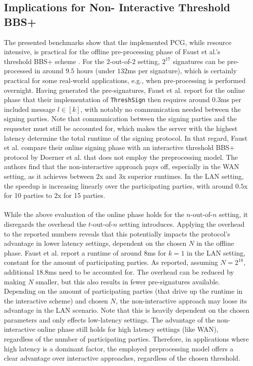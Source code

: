 \subsection{Implications for Non-
\label{subsec:implNIBBs+}
Interactive Threshold BBS+}
The presented benchmarks show that the implemented PCG, while resource intensive, is practical for the offline pre-processing phase of Faust et al.'s threshold BBS+ scheme \cite{cryptoeprint:2023/1076}. For the $2$-out-of-$2$ setting, $2^{17}$ signatures can be pre-processed in around $9.5$ hours (under $132$ms per signature), which is certainly practical for some real-world applications, e.g., when pre-processing is performed overnight. Having generated the pre-signatures, Faust et al. \cite{cryptoeprint:2023/1076} report for the online phase that their implementation of \texttt{ThreshSign} then requires around $0.3$ms per included message $l\in[k]$, with notably no communication needed between the signing parties. Note that communication between the signing parties and the requester must still be accounted for, which makes the server with the highest latency determine the total runtime of the signing protocol. In that regard, Faust et al. compare their online signing phase with an interactive threshold BBS+ protocol by Doerner et al. \cite{doerner2023threshold} that does not employ the preprocessing model. The authors find that the non-interactive approach pays off, especially in the WAN setting, as it achieves between $2$x and $3$x superior runtimes. In the LAN setting, the speedup is increasing linearly over the participating parties, with around $0.5$x for 10 parties to $2$x for 15 parties.
\\\\
While the above evaluation of the online phase holds for the $n$-out-of-$n$ setting, it disregards the overhead the $t$-out-of-$n$ setting introduces. Applying the overhead to the reported numbers reveals that this potentially impacts the protocol's advantage in lower latency settings, dependent on the chosen $N$ in the offline phase. Faust et al. report a runtime of around $8$ms for $k=1$ in the LAN setting, constant for the amount of participating parties. As reported, assuming $N=2^{18}$, additional $18.8$ms need to be accounted for. The overhead can be reduced by making $N$ smaller, but this also results in fewer pre-signatures available. Depending on the amount of participating parties (that drive up the runtime in the interactive scheme) and chosen $N$, the non-interactive approach may loose its advantage in the LAN scenario. Note that this is heavily dependent on the chosen parameters and only effects low-latency settings. The advantage of the non-interactive online phase still holds for high latency settings (like WAN), regardless of the number of participating parties. Therefore, in applications where high latency is a dominant factor, the employed preprocessing model offers a clear advantage over interactive approaches, regardless of the chosen threshold.